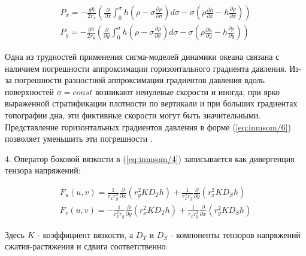 	\begin{equation} \label{eq:inmsom/6} 
	\begin{array}{c} 
	\displaystyle{P_{x} =-\frac{g h}{2 r_x} \left(\frac{\partial }{\partial x} \int _{0}^{\sigma }h\left(\rho -\sigma \frac{\partial \rho }{\partial \sigma } \right) d\sigma -\sigma \left(\rho \frac{\partial h}{\partial x} -h\frac{\partial \rho }{\partial x} \right)\right)} \\ 
	
	\displaystyle{P_{y} =-\frac{g h}{2 r_y} \left(\frac{\partial }{\partial y} \int _{0}^{\sigma }h\left(\rho -\sigma \frac{\partial \rho }{\partial \sigma } \right) d\sigma -\sigma \left(\rho \frac{\partial h}{\partial y} -h\frac{\partial \rho }{\partial y} \right)\right)} 
	\end{array} 
	\end{equation} 
	
	Одна из трудностей применения сигма-моделей динамики океана связана с наличием погрешности аппроксимации горизонтального градиента давления.
	Из-за погрешности разностной аппроксимации градиентов давления вдоль поверхностей $\sigma = const$ возникают ненулевые скорости и иногда,
	при ярко выраженной стратификации плотности по вертикали и при больших градиентах топографии дна, эти фиктивные скорости могут быть значительными.
	Представление горизонтальных градиентов давления в форме (\ref{eq:inmsom/6}) позволяет уменьшить эти погрешности \cite{INMOM}.

	4. Оператор боковой вязкости в (\ref{eq:inmsom/4}) записывается как дивергенция тензора напряжений:

	\begin{equation} \label{eq:inmsom/7} 
	\begin{array}{c} 
	\displaystyle{F_{u} (u,v)=\frac{1}{r_x r_{y}^2 } \frac{\partial }{\partial x} \left(r_{y} ^{2} KD_{T} h\right)+\frac{1}{r_{x}^2 r_y } \frac{\partial }{\partial y} \left(r_{x} ^{2} KD_{S} h\right)} \\ 
	
	\displaystyle{F_{v} (u,v)=-\frac{1}{r_{x}^2 r_y} \frac{\partial }{\partial y} \left(r_{x} ^{2} KD_{T} h\right)+\frac{1}{r_x r_{y}^2} \frac{\partial }{\partial x} \left(r_{y} ^{2} KD_{S} h\right)} 
	\end{array} 
	\end{equation} 

	Здесь $\textit{K}$ - коэффициент вязкости, а $D_T$ и $D_S$ - компоненты тензоров напряжений сжатия-растяжения и сдвига соответственно:

